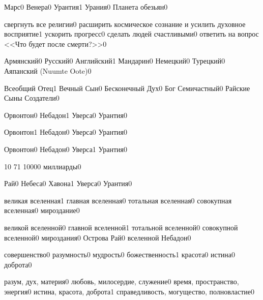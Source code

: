 \quizheader


{Марс}{0}
{Венера}{0}
{Урантия}{1}
{Урания}{0}
{Планета обезьян}{0}
\qstop

{свергнуть все религии}{0}
{расширить космическое сознание и усилить духовное восприятие}{1}
{ускорить прогресс}{0}
{сделать людей счастливыми}{0}
{ответить на вопрос <<Что будет после смерти?>>}{0}
\qstop

{Армянский}{0}
{Русский}{0}
{Английский}{1}
{Мандарин}{0}
{Немецкий}{0}
{Турецкий}{0}
{Аяпанский (Nuumte Oote)}{0}
\qstop

{Всеобщий Отец}{1}
{Вечный Сын}{0}
{Бесконечный Дух}{0}
{Бог Семичастный}{0}
{Райские Сыны Создатели}{0}
\qstop

{Орвонтон}{0}
{Небадон}{1}
{Уверса}{0}
{Урантия}{0}
\qstop

{Орвонтон}{1}
{Небадон}{0}
{Уверса}{0}
{Урантия}{0}
\qstop

{Орвонтон}{0}
{Небадон}{0}
{Уверса}{1}
{Урантия}{0}
\qstop

{1}{0}
{7}{1}
{1000}{0}
{миллиарды}{0}
\qstop

{Рай}{0}
{Небеса}{0}
{Хавона}{1}
{Уверса}{0}
{Урантия}{0}
\qstop

{великая вселенная}{1}
{главная вселенная}{0}
{тотальная вселенная}{0}
{совокупная вселенная}{0}
{мироздание}{0}
\qstop

{великой вселенной}{0}
{главной вселенной}{1}
{тотальной вселенной}{0}
{совокупной вселенной}{0}
{мироздания}{0}
{Острова Рай}{0}
{вселенной Небадон}{0}
\qstop

{совершенство}{0}
{разумность}{0}
{мудрость}{0}
{божественность}{1}
{красота}{0}
{истина}{0}
{доброта}{0}
\qstop

{разум, дух, материя}{0}
{любовь, милосердие, служение}{0}
{время, пространство, энергия}{0}
{истина, красота, доброта}{1}
{справедливость, могущество, полновластие}{0}
\qstop

